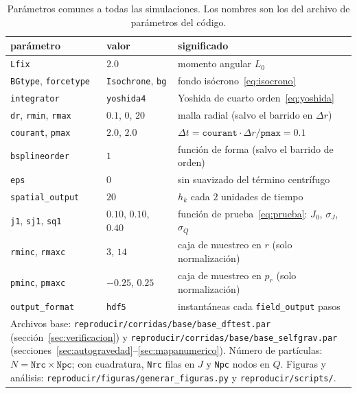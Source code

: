 \documentclass[11pt,a4paper]{article}
\newcommand{\rp}{p_r}
\newcommand{\Jr}{J}
\newcommand{\Qr}{Q}
\theoremstyle{definition}
\begin{document}
\begin{table}[ht]
\centering
\small
\caption{Parámetros comunes a todas las simulaciones. Los nombres son los del archivo
de parámetros del código.}
\label{tab:comun}
\begin{tabular}{p{}p{}p{}}
\toprule
parámetro & valor & significado \\
\midrule
\texttt{Lfix} & $2.0$ & momento angular $L_0$ \\
\texttt{BGtype}, \texttt{forcetype} & \texttt{Isochrone}, \texttt{bg} & fondo isócrono~\eqref{eq:isocrono} \\
\texttt{integrator} & \texttt{yoshida4} & Yoshida de cuarto orden~\eqref{eq:yoshida} \\
\texttt{dr}, \texttt{rmin}, \texttt{rmax} & $0.1$, $0$, $20$ & malla radial (salvo el barrido en $\Delta r$) \\
\texttt{courant}, \texttt{pmax} & $2.0$, $2.0$ & $\Delta t=\texttt{courant}\cdot\Delta r/\texttt{pmax}=0.1$ \\
\texttt{bsplineorder} & $1$ & función de forma (salvo el barrido de orden) \\
\texttt{eps} & $0$ & sin suavizado del término centrífugo \\
\texttt{spatial\_output} & $20$ & $h_k$ cada $2$ unidades de tiempo \\
\texttt{j1}, \texttt{sj1}, \texttt{sq1} & $0.10$, $0.10$, $0.40$ & función de prueba~\eqref{eq:prueba}: $\Jr_0$, $\sigma_J$, $\sigma_Q$ \\
\texttt{rminc}, \texttt{rmaxc} & $3$, $14$ & caja de muestreo en $r$ (solo normalización) \\
\texttt{pminc}, \texttt{pmaxc} & $-0.25$, $0.25$ & caja de muestreo en $\rp$ (solo normalización) \\
\texttt{output\_format} & \texttt{hdf5} & instantáneas cada \texttt{field\_output} pasos \\
\midrule
\multicolumn{3}{p{0.94\textwidth}}{Archivos base: \texttt{reproducir/corridas/base/base\_dftest.par}
(sección~\ref{sec:verificacion}) y \texttt{reproducir/corridas/base/base\_selfgrav.par}
(secciones~\ref{sec:autogravedad}--\ref{sec:mapanumerico}). Número de partículas:
$N=\texttt{Nrc}\times\texttt{Npc}$; con cuadratura, \texttt{Nrc} filas en $\Jr$ y
\texttt{Npc} nodos en $\Qr$. Figuras y análisis:
\texttt{reproducir/figuras/generar\_figuras.py} y \texttt{reproducir/scripts/}.} \\
\bottomrule
\end{tabular}
\end{table}
\end{document}
